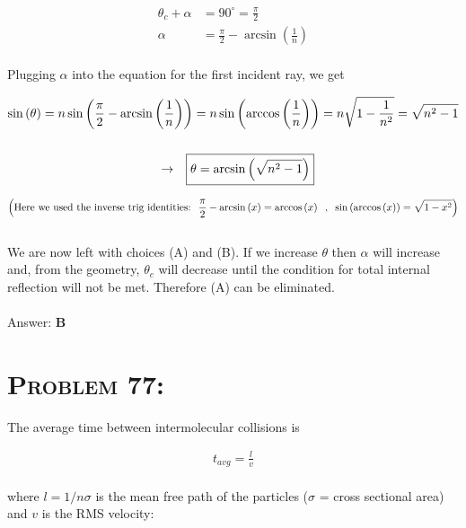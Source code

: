 \documentclass{article}
\begin{document}
\begin{align}
\theta_{c} + \alpha &= 90^{\circ} = \frac{\pi}{2}\nonumber\\
\alpha &= \frac{\pi}{2} - \arcsin{\left(\frac{1}{n}\right)}\nonumber
\end{align}
\\
Plugging $\alpha$ into the equation for the first incident ray, we get

\begin{gather}
\sin{(\theta)} = n \sin{\left(\frac{\pi}{2} - \arcsin{\left(\frac{1}{n}\right)}\right)} = n \sin{\left( \arccos{\left(\frac{1}{n}\right)}\right)}= n \sqrt{1-\frac{1}{n^{2}}} = \sqrt {n^2 - 1}\nonumber\\
\nonumber\\
\hspace{.1in} \rightarrow \hspace{.1in} \boxed{\theta = \arcsin{\left(\sqrt {n^2 - 1}\right)}}\nonumber
\end{gather}

\begin{align}
\left(  \text{Here we used the inverse trig identities:} \hspace{.1in} {\frac{\pi}{2} - \arcsin{(x)} = \arccos{(x)}}  \hspace{.1in} \text{,} \hspace{.1in}  {\sin{\left(\arccos{(x)}\right)} = \sqrt{1 - x^{2}}} \right)\nonumber
\end{align}
\\
We are now left with choices (A) and (B). If we increase $\theta$ then $\alpha$ will increase and, from the geometry, $\theta_{c}$ will decrease until the condition for total internal reflection will not be met. Therefore (A) can be eliminated.
\\\\
Answer: \textbf{\textcolor{ProcessBlue}B}\\


\section{\textsc{Problem 77:}} The average time between intermolecular collisions is

\begin{align}
t_{avg} = \frac{l}{v}
\end{align}
\\
where $l = 1/n \sigma$ is the mean free path of the particles ($\sigma$ = cross sectional area) and $v$ is the RMS velocity:
\end{document}
